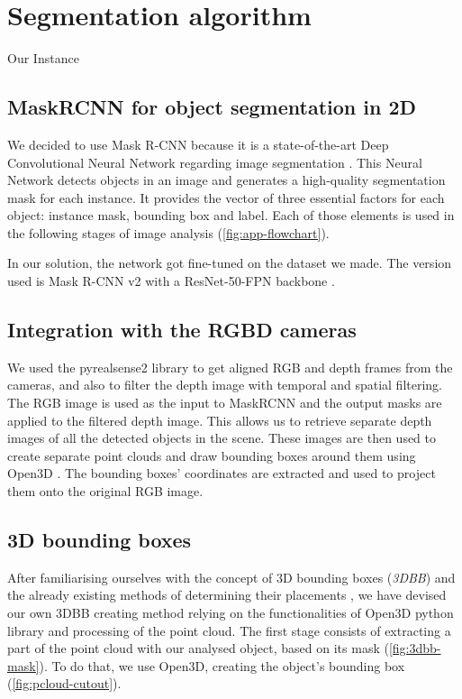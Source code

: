 \section{Segmentation algorithm}
Our Instance

\subsection{MaskRCNN for object segmentation in 2D}
We decided to use Mask R-CNN because it is a state-of-the-art Deep Convolutional Neural Network regarding image segmentation \cite{he2018mask, matterport_maskrcnn_2017}. This Neural Network detects objects in an image and generates a high-quality segmentation mask for each instance. It provides the vector of three essential factors for each object: instance mask, bounding box and label. Each of those elements is used in the following stages of image analysis (\cref{fig:app-flowchart}).

In our solution, the network got fine-tuned \cite{shinya2019understanding} on the dataset we made. The version used is Mask R-CNN v2 with a ResNet-50-FPN backbone \cite{li2021benchmarking}.

\subsection{Integration with the RGBD cameras}
We used the pyrealsense2 \cite{pyrealsense2-doc} library to get aligned RGB and depth frames from the cameras, and also to filter the depth image with temporal and spatial filtering. The RGB image is used as the input to MaskRCNN and the output masks are applied to the filtered depth image. This allows us to retrieve separate depth images of all the detected objects in the scene. These images are then used to create separate point clouds and draw bounding boxes around them using Open3D \cite{Zhou2018open3d}. The bounding boxes’ coordinates are extracted and used to project them onto the original RGB image.

\subsection{3D bounding boxes}
After familiarising ourselves with the concept of 3D bounding boxes (\textit{3DBB}) and the already existing methods of determining their placements \cite{MousavianAFK16}, we have devised our own 3DBB creating method relying on the functionalities of Open3D python library \cite{Zhou2018open3d} and processing of the point cloud. The first stage consists of extracting a part of the point cloud with our analysed object, based on its mask (\cref{fig:3dbb-mask}). To do that, we use Open3D, creating the object's bounding box (\cref{fig:pcloud-cutout}).

